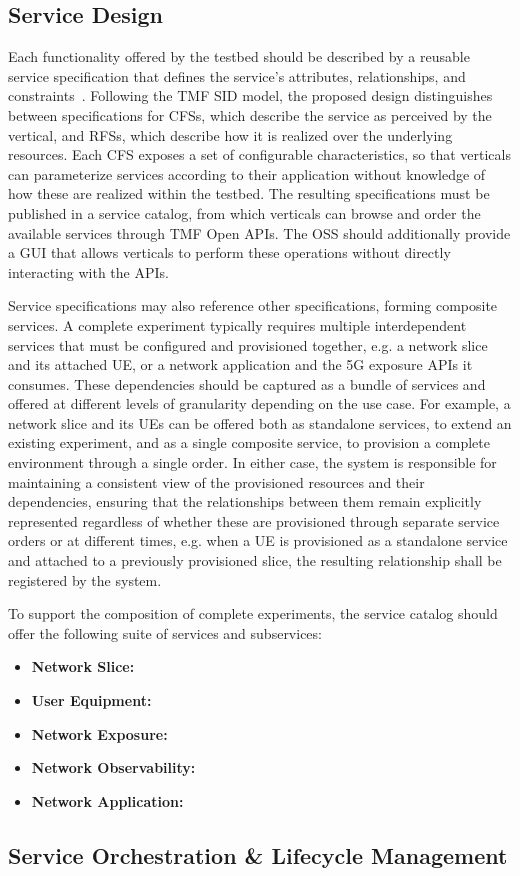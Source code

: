 \subsection{Service Design}
\label{chap:proposal:delivery:design}

Each functionality offered by the testbed should be described by a reusable service specification that defines the service's attributes, relationships, and constraints~\cite{SIDTMF, SID-MODELS-v250-TMF}. Following the \acs{TMF} \acs{SID} model, the proposed design distinguishes between specifications for \acsp{CFS}, which describe the service as perceived by the vertical, and \acsp{RFS}, which describe how it is realized over the underlying resources. Each \acs{CFS} exposes a set of configurable characteristics, so that verticals can parameterize services according to their application without knowledge of how these are realized within the testbed. The resulting specifications must be published in a service catalog, from which verticals can browse and order the available services through \acs{TMF} Open \acsp{API}. The \acs{OSS} should additionally provide a \acs{GUI} that allows verticals to perform these operations without directly interacting with the \acsp{API}.

Service specifications may also reference other specifications, forming composite services. A complete experiment typically requires multiple interdependent services that must be configured and provisioned together, e.g. a network slice and its attached \acs{UE}, or a network application and the \acs{5G} exposure \acsp{API} it consumes. These dependencies should be captured as a bundle of services and offered at different levels of granularity depending on the use case. For example, a network slice and its \acsp{UE} can be offered both as standalone services, to extend an existing experiment, and as a single composite service, to provision a complete environment through a single order. In either case, the system is responsible for maintaining a consistent view of the provisioned resources and their dependencies, ensuring that the relationships between them remain explicitly represented regardless of whether these are provisioned through separate service orders or at different times, e.g. when a \acs{UE} is provisioned as a standalone service and attached to a previously provisioned slice, the resulting relationship shall be registered by the system. 

To support the composition of complete experiments, the service catalog should offer the following suite of services and subservices:
\begin{itemize}
    \item \textbf{Network Slice:}
    \item \textbf{User Equipment:}
    \item \textbf{Network Exposure:}
    \item \textbf{Network Observability:}
    \item \textbf{Network Application:}
\end{itemize}

\subsection{Service Orchestration \& Lifecycle Management}
\label{chap:proposal:delivery:orchestration-lifecycle}
